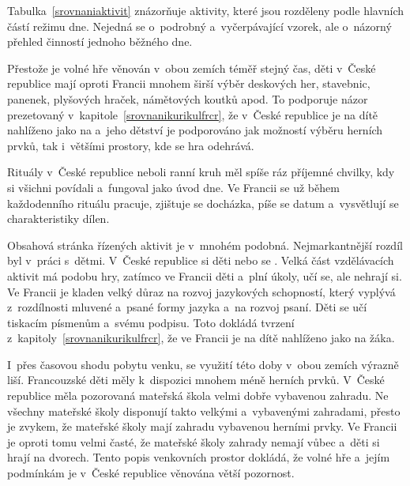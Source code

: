 	Tabulka~\ref{srovnaniaktivit} znázorňuje aktivity, které jsou rozděleny podle hlavních částí režimu dne. Nejedná se o~podrobný a~vyčerpávající vzorek, ale o~názorný přehled činností jednoho běžného dne. 

	Přestože je volné hře věnován v~obou zemích téměř stejný čas, děti v~České republice mají oproti Francii mnohem širší výběr deskových her, stavebnic, panenek, plyšových hraček, námětových koutků apod. To podporuje názor prezetovaný v~kapitole~\ref{srovnanikurikulfrcr}, že v~České republice je na dítě nahlíženo jako na  a~jeho dětství je podporováno jak možností výběru herních prvků, tak i~většími prostory, kde se hra odehrává. 

	Rituály v~České republice neboli ranní kruh měl spíše ráz příjemné chvilky, kdy si všichni povídali a~fungoval jako úvod dne. Ve Francii se už během každodenního rituálu pracuje, zjištuje se docházka, píše se datum a~vysvětlují se charakteristiky dílen.

	Obsahová stránka řízených aktivit je v~mnohém podobná. Nejmarkantnější rozdíl byl v~práci s~dětmi. V~České republice si děti  nebo se . Velká část vzdělávacích aktivit má podobu hry, zatímco ve Francii děti  a~plní úkoly, učí se, ale nehrají si. Ve Francii je kladen velký důraz na rozvoj jazykových schopností, který vyplývá z~rozdílnosti mluvené a~psané formy jazyka a~na rozvoj psaní. Děti se učí tiskacím písmenům a~svému podpisu. Toto dokládá tvrzení z~kapitoly~\ref{srovnanikurikulfrcr}, že ve Francii je na dítě nahlíženo jako na žáka.

	I~přes časovou shodu pobytu venku, se využití této doby v~obou zemích výrazně liší. Francouzské děti měly k~dispozici mnohem méně herních prvků. V~České republice měla pozorovaná mateřská škola velmi dobře vybavenou zahradu. Ne všechny mateřské školy disponují takto velkými a~vybavenými zahradami, přesto je zvykem, že mateřské školy mají zahradu vybavenou herními prvky. Ve Francii je oproti tomu velmi časté, že mateřské školy zahrady nemají vůbec a~děti si hrají na dvorech. Tento popis venkovních prostor dokládá, že volné hře a~jejím podmínkám je v~České republice věnována větší pozornost.



		
	


